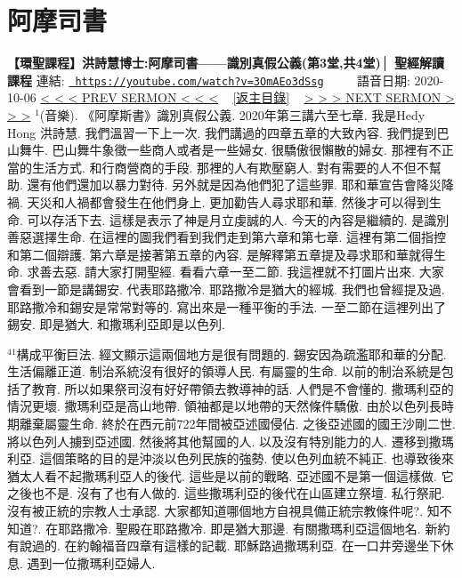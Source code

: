\documentclass{book}
\begin{document}
\section{阿摩司書}
\label{sec:3OmAEo3dSsg}
\textbf{【環聖課程】洪詩慧博士:阿摩司書——識別真假公義(第3堂,共4堂)│ 聖經解讀課程}
\newline
\newline
連結: \href{https://youtube.com/watch?v=3OmAEo3dSsg}{\texttt{ https://youtube.com/watch?v=3OmAEo3dSsg}} ~~~~ 語音日期: 2020-10-06 
\newline
\newline
\hyperref[sec:g1wzcqEF6WA]{\small{< < < PREV SERMON < < <}}
~
\hyperref[sec:index]{\small{[返主目錄]}}
~
\hyperref[sec:s7QrDPLqvfM]{\small{> > > NEXT SERMON > > >}}
\newline
\newline
$^{1}$(音樂).
《阿摩斯書》識別真假公義.
2020年第三講六至七章.
我是Hedy Hong 洪詩慧.
我們溫習一下上一次.
我們講過的四章五章的大致內容.
我們提到巴山舞牛.
巴山舞牛象徵一些商人或者是一些婦女.
很驕傲很懶散的婦女.
那裡有不正當的生活方式.
和行商營商的手段.
那裡的人有欺壓窮人.
對有需要的人不但不幫助.
還有他們還加以暴力對待.
另外就是因為他們犯了這些罪.
耶和華宣告會降災降禍.
天災和人禍都會發生在他們身上.
更加勸告人尋求耶和華.
然後才可以得到生命.
可以存活下去.
這樣是表示了神是月立虔誠的人.
今天的內容是繼續的.
是識別善惡選擇生命.
在這裡的圖我們看到我們走到第六章和第七章.
這裡有第二個指控和第二個辯護.
第六章是接著第五章的內容.
是解釋第五章提及尋求耶和華就得生命.
求善去惡.
請大家打開聖經.
看看六章一至二節.
我這裡就不打圖片出來.
大家會看到一節是講錫安.
代表耶路撒冷.
耶路撒冷是猶大的經城.
我們也曾經提及過.
耶路撒冷和錫安是常常對等的.
寫出來是一種平衡的手法.
一至二節在這裡列出了錫安.
即是猶大.
和撒瑪利亞即是以色列.

$^{41}$構成平衡巨法.
經文顯示這兩個地方是很有問題的.
錫安因為疏濫耶和華的分配.
生活偏離正道.
制治系統沒有很好的領導人民.
有屬靈的生命.
以前的制治系統是包括了教育.
所以如果祭司沒有好好帶領去教導神的話.
人們是不會懂的.
撒瑪利亞的情況更壞.
撒瑪利亞是高山地帶.
領袖都是以地帶的天然條件驕傲.
由於以色列長時期離棄屬靈生命.
終於在西元前722年間被亞述國侵佔.
之後亞述國的國王沙剛二世.
將以色列人擄到亞述國.
然後將其他幫國的人.
以及沒有特別能力的人.
遷移到撒瑪利亞.
這個策略的目的是沖淡以色列民族的強勢.
使以色列血統不純正.
也導致後來猶太人看不起撒瑪利亞人的後代.
這些是以前的戰略.
亞述國不是第一個這樣做.
它之後也不是.
沒有了也有人做的.
這些撒瑪利亞的後代在山區建立祭壇.
私行祭祀.
沒有被正統的宗教人士承認.
大家都知道哪個地方自視具備正統宗教條件呢?.
知不知道?.
在耶路撒冷.
聖殿在耶路撒冷.
即是猶大那邊.
有關撒瑪利亞這個地名.
新約有說過的.
在約翰福音四章有這樣的記載.
耶穌路過撒瑪利亞.
在一口井旁邊坐下休息.
遇到一位撒瑪利亞婦人.
\end{document}
